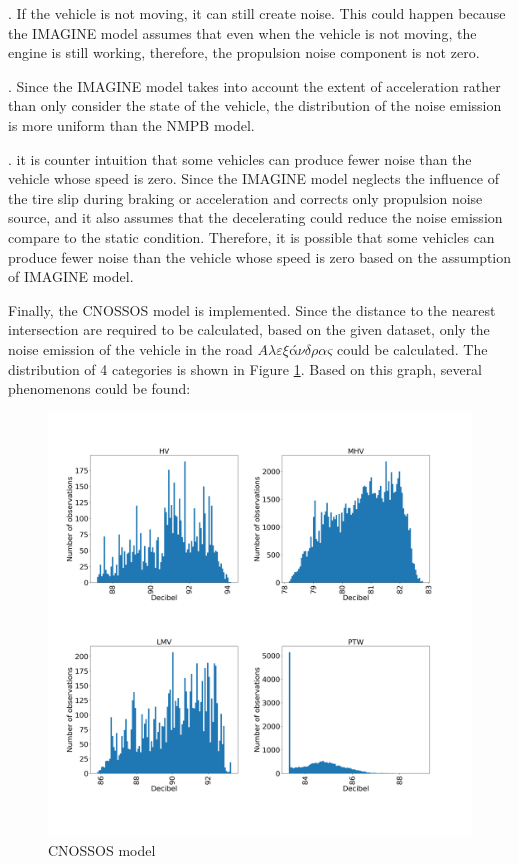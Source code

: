 \documentclass{article}
\begin{document}
. If the vehicle is not moving, it can still create noise. This could happen because the IMAGINE model assumes that even when the vehicle is not moving, the engine is still working, therefore, the propulsion noise component is not zero.


. Since the IMAGINE model takes into account the extent of acceleration rather than only consider the state of the vehicle, the distribution of the noise emission is more uniform than the NMPB model.

. it is counter intuition that some vehicles can produce fewer noise than the vehicle whose speed is zero.  Since the IMAGINE model neglects the influence of the tire slip during braking or acceleration and corrects only propulsion noise source, and it also assumes that the decelerating could reduce the noise emission compare to the static condition. Therefore, it is possible that some vehicles can produce fewer noise than the vehicle whose speed is zero based on the assumption of IMAGINE model.

\noindent Finally, the CNOSSOS model is implemented. Since the distance to the nearest intersection are required to be calculated, based on the given dataset, only the noise emission of the vehicle in the road $Αλεξάνδρας$ could be calculated. The distribution of 4 categories is shown in Figure \ref{CNOSSOS model}. Based on this graph, several phenomenons could be found:

\begin{figure}[h]
    \begin{center}
        \includegraphics[width=14cm]{CNOSSOS model.png} 
        \caption{CNOSSOS model}
        \label{CNOSSOS model}
    \end{center}
\end{figure}
\end{document}
